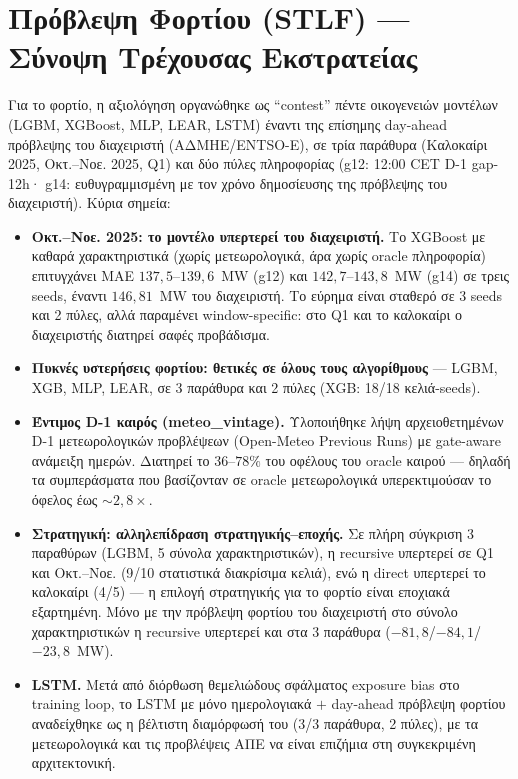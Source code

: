 \section{Πρόβλεψη Φορτίου (STLF) --- Σύνοψη Τρέχουσας Εκστρατείας}
\label{sec:lf_load}


Για το φορτίο, η αξιολόγηση οργανώθηκε ως ``contest'' πέντε οικογενειών μοντέλων
(LGBM, XGBoost, MLP, LEAR, LSTM) έναντι της επίσημης day-ahead πρόβλεψης του
διαχειριστή (ΑΔΜΗΕ/ENTSO-E), σε τρία παράθυρα (Καλοκαίρι 2025, Οκτ.--Νοε. 2025,
Q1) και δύο πύλες πληροφορίας (g12: 12:00 CET D-1 gap-12h· g14: ευθυγραμμισμένη
με τον χρόνο δημοσίευσης της πρόβλεψης του διαχειριστή). Κύρια σημεία:

\begin{itemize}
  \item \textbf{Οκτ.--Νοε. 2025: το μοντέλο υπερτερεί του διαχειριστή.} Το
        XGBoost με καθαρά χαρακτηριστικά (χωρίς μετεωρολογικά, άρα χωρίς
        oracle πληροφορία) επιτυγχάνει MAE $137{,}5$--$139{,}6$~MW (g12) και
        $142{,}7$--$143{,}8$~MW (g14) σε τρεις seeds, έναντι $146{,}81$~MW του
        διαχειριστή. %
        Το εύρημα είναι σταθερό σε 3 seeds και 2 πύλες, αλλά παραμένει
        window-specific: στο Q1 και το καλοκαίρι ο διαχειριστής διατηρεί
        σαφές προβάδισμα.
  \item \textbf{Πυκνές υστερήσεις φορτίου: θετικές σε όλους τους αλγορίθμους} ---
        LGBM, XGB, MLP, LEAR, σε 3 παράθυρα και 2 πύλες (XGB: 18/18 κελιά-seeds).
  \item \textbf{Έντιμος D-1 καιρός (meteo\_vintage).} Υλοποιήθηκε λήψη
        αρχειοθετημένων D-1 μετεωρολογικών προβλέψεων (Open-Meteo Previous Runs)
        με gate-aware ανάμειξη ημερών. Διατηρεί το $36$--$78\%$ του οφέλους του
        oracle καιρού --- δηλαδή τα συμπεράσματα που βασίζονταν σε oracle
        μετεωρολογικά υπερεκτιμούσαν το όφελος έως $\sim\!2{,}8\times$.
  \item \textbf{Στρατηγική: αλληλεπίδραση στρατηγικής--εποχής.} Σε πλήρη σύγκριση
        3 παραθύρων (LGBM, 5 σύνολα χαρακτηριστικών), η recursive υπερτερεί σε
        Q1 και Οκτ.--Νοε. (9/10 στατιστικά διακρίσιμα κελιά), ενώ η direct
        υπερτερεί το καλοκαίρι (4/5) --- η επιλογή στρατηγικής για το φορτίο
        είναι εποχιακά εξαρτημένη. Μόνο με την πρόβλεψη φορτίου του διαχειριστή
        στο σύνολο χαρακτηριστικών η recursive υπερτερεί και στα 3 παράθυρα
        ($-81{,}8$/$-84{,}1$/$-23{,}8$~MW). %
  \item \textbf{LSTM.} Μετά από διόρθωση θεμελιώδους σφάλματος exposure bias στο
        training loop, το LSTM με μόνο ημερολογιακά $+$ day-ahead πρόβλεψη
        φορτίου αναδείχθηκε ως η βέλτιστη διαμόρφωσή του (3/3 παράθυρα, 2 πύλες),
        με τα μετεωρολογικά και τις προβλέψεις ΑΠΕ να είναι επιζήμια στη
        συγκεκριμένη αρχιτεκτονική.
\end{itemize}

